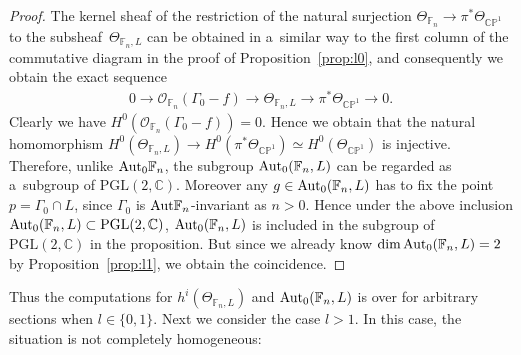 \begin{proof}
The kernel sheaf of the restriction of the natural surjection $\Theta_{\mathbb{F}_n}\to \pi^*\Theta_{\mathbb{CP}^1}$ to
the subsheaf~$\Theta_{\mathbb{F}_n,L}$ can be obtained in a~similar way to the f\/irst column of the commutative diagram
in the proof of Proposition~\ref{prop:l0}, and consequently we obtain the exact sequence
\begin{gather}
\label{ntses}
0
 \longrightarrow
\mathscr O_{\mathbb{F}_n} (\Gamma_0 - f)
 \longrightarrow
\Theta_{\mathbb{F}_n,L}
 \longrightarrow
\pi^*\Theta_{\mathbb{CP}^1}
\longrightarrow
0.
\end{gather}
Clearly we have $H^0 (\mathscr O_{\mathbb{F}_n} (\Gamma_0 - f ) )=0$.
Hence we obtain that the natural homomorphism $H^0(\Theta_{\mathbb{F}_n,L} ) \to H^0( \pi^*\Theta_{\mathbb{CP}^1})\simeq
H^0(\Theta_{\mathbb{CP}^1})$ is injective.
Therefore, unlike ${\rm{Aut}}_0\mathbb{F}_n$, the subgroup ${\rm{Aut}}_0(\mathbb{F}_n,L)$ can be regarded as
a~subgroup of $\mathrm{PGL}(2,\mathbb{C})$.
Moreover any $g\in {\rm{Aut}}_0(\mathbb{F}_n,L)$ has to f\/ix the point $p = \Gamma_0\cap L$, since $\Gamma_0$ is
${\rm{Aut}}\mathbb{F}_n$-invariant as $n>0$.
Hence under the above inclusion ${\rm{Aut}}_0(\mathbb{F}_n,L)\subset\mathrm{PGL}(2,\mathbb{C})$,
${\rm{Aut}}_0(\mathbb{F}_n,L)$ is included in the subgroup of $\mathrm{PGL}(2,\mathbb{C})$ in the proposition.
But since we already know $\dim {\rm{Aut}}_0(\mathbb{F}_n,L)=2$ by Proposition~\ref{prop:l1}, we obtain the coincidence.
\end{proof}

Thus the computations for $h^i(\Theta_{\mathbb{F}_n,L})$ and ${\rm{Aut}}_0(\mathbb{F}_n,L)$ is over for arbitrary
sections when $l\in \{0,1\}$.
Next we consider the case $l>1$.
In this case, the situation is not completely homogeneous:

